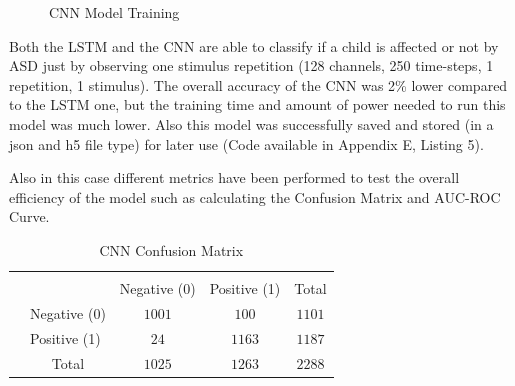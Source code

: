\begin{figure}[ht!]%
    \centering
    \qquad
    \caption{CNN Model Training}%
    \label{fig:example2}%
\end{figure}

Both the LSTM and the CNN are able to classify if a child is affected or not by ASD just by observing one stimulus repetition (128 channels, 250 time-steps, 1 repetition, 1 stimulus). The overall accuracy of the CNN was 2\% lower compared to the LSTM one, but the training time and amount of power needed to run this model was much lower. Also this model was successfully saved and stored (in a json and h5 file type) for later use (Code available in Appendix E, Listing 5). 



Also in this case different metrics have been performed to test the overall efficiency of the model such as calculating the Confusion Matrix and AUC-ROC Curve.


{
\begin{table}[h!]
\centering
\begin{tabular}{l|l|c|c|c}
\multicolumn{2}{c}{}&\multicolumn{2}{c}{}&\\
\cline{3-4}
\multicolumn{2}{c|}{}&Negative (0)&Positive (1)&\multicolumn{1}{c}{Total}\\
\cline{2-4}
\multirow{}{}{}& Negative (0) & $1001$ & $100$ & $1101$\\
\cline{2-4}
& Positive (1) & $24$ & $1163$ & $1187$\\
\cline{2-4}
\multicolumn{1}{c}{} & \multicolumn{1}{c}{Total} & \multicolumn{1}{c}{$1025$} & \multicolumn{    1}{c}{$1263$} & \multicolumn{1}{c}{$2288$}\\
\end{tabular}
\caption{CNN Confusion Matrix}
\label{table:1}
\end{table}
}

